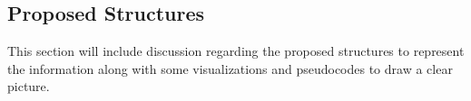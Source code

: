 


\subsection{Proposed Structures}
This section will include discussion regarding the proposed structures to represent the information along with some visualizations and pseudocodes to draw a clear picture.

